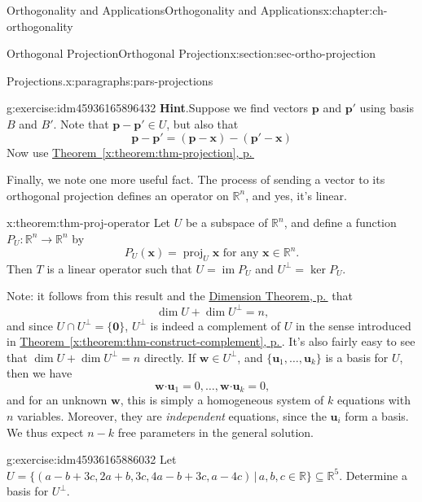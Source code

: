 \documentclass[oneside,10pt,]{book}
\newcommand{\blocktitlefont}{\relax}
\newcommand{\xreffont}{\relax}
\numberwithin{equation}{section}
\newcommand{\R}{\mathbb{R}}
\newcommand{\im}{\operatorname{im}}
\newcommand{\dotp}{\!\boldsymbol{\cdot}\!}
\newcommand{\proj}[2]{\operatorname{proj}_{#1}{#2}}
\newcommand{\uu}{\mathbf{u}}
\newcommand{\ww}{\mathbf{w}}
\newcommand{\xx}{\mathbf{x}}
\begin{document}
\begin{chapterptx}{Orthogonality and Applications}{}{Orthogonality and Applications}{}{}{x:chapter:ch-orthogonality}
\begin{sectionptx}{Orthogonal Projection}{}{Orthogonal Projection}{}{}{x:section:sec-ortho-projection}
\begin{paragraphs}{Projections.}{x:paragraphs:pars-projections}
\begin{inlineexercise}{}{g:exercise:idm45936165896432}
\noindent\textbf{\blocktitlefont Hint}.\label{g:hint:idm45936165894880}{}\hypertarget{g:hint:idm45936165894880}{}\quad{}Suppose we find vectors \(\mathbf{p}\) and \(\mathbf{p}'\) using basis \(B\) and \(B'\). Note that \(\mathbf{p}-\mathbf{p}'\in U\), but also that%
\begin{equation*}
\mathbf{p}-\mathbf{p}' = (\mathbf{p}-\xx)-(\mathbf{p}'-\xx)
\end{equation*}
Now use \hyperref[x:theorem:thm-projection]{Theorem~{\xreffont\ref{x:theorem:thm-projection}}, p.\,\pageref{x:theorem:thm-projection}}%
\end{inlineexercise}%
Finally, we note one more useful fact. The process of sending a vector to its orthogonal projection defines an operator on \(\R^n\), and yes, it's linear.%
\begin{theorem}{}{}{x:theorem:thm-proj-operator}%
Let \(U\) be a subspace of \(\R^n\), and define a function \(P_U:\R^n\to \R^n\) by%
\begin{equation*}
P_U(\xx) = \proj{U}{\xx} \text{ for any } \xx\in\R^n\text{.}
\end{equation*}
Then \(T\) is a linear operator such that \(U=\im P_U\) and \(U^\bot = \ker P_U\).%
\end{theorem}
Note: it follows from this result and the \hyperref[x:theorem:thm-dimension-lintrans]{Dimension Theorem, p.\,\pageref{x:theorem:thm-dimension-lintrans}} that%
\begin{equation*}
\dim U + \dim U^\bot = n\text{,}
\end{equation*}
and since \(U\cap U^\bot = \{\mathbf{0}\}\), \(U^\bot\) is indeed a complement of \(U\) in the sense introduced in \hyperref[x:theorem:thm-construct-complement]{Theorem~{\xreffont\ref{x:theorem:thm-construct-complement}}, p.\,\pageref{x:theorem:thm-construct-complement}}. It's also fairly easy to see that \(\dim U + \dim U^\bot = n\) directly. If \(\ww\in U^\bot\), and \(\{\uu_1,\ldots, \uu_k\}\) is a basis for \(U\), then we have%
\begin{equation*}
\ww\dotp \uu_1= 0, \ldots, \ww\dotp \uu_k=0\text{,}
\end{equation*}
and for an unknown \(\ww\), this is simply a homogeneous system of \(k\) equations with \(n\) variables. Moreover, they are \emph{independent} equations, since the \(\uu_i\) form a basis. We thus expect \(n-k\) free parameters in the general solution.%
\begin{inlineexercise}{}{g:exercise:idm45936165886032}%
Let \(U = \{(a-b+3c, 2a+b, 3c, 4a-b+3c,a-4c)\,|\, a,b,c\in\R\}\subseteq \R^5\). Determine a basis for \(U^\bot\).%

\end{inlineexercise}
\end{paragraphs}
\end{sectionptx}
\end{chapterptx}
\end{document}
